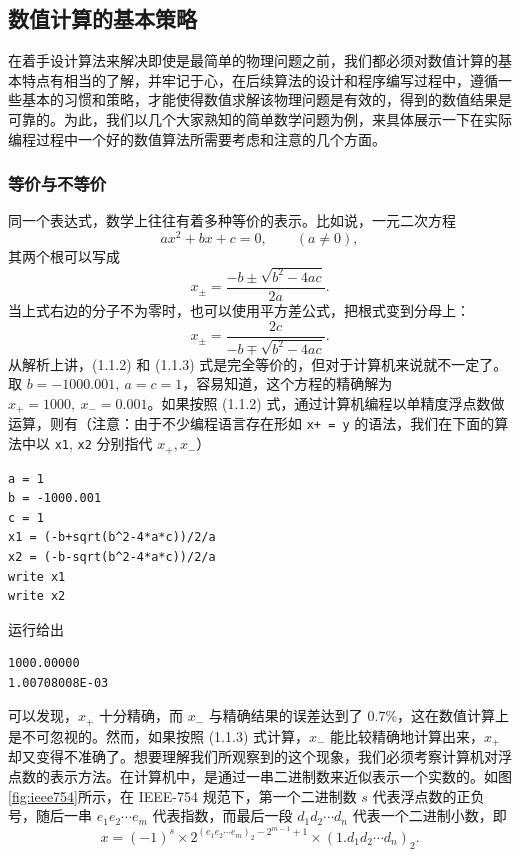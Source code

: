 \subsection{数值计算的基本策略}

在着手设计算法来解决即使是最简单的物理问题之前，我们都必须对数值计算的基本特点有相当的了解，并牢记于心，在后续算法的设计和程序编写过程中，遵循一些基本的习惯和策略，才能使得数值求解该物理问题是有效的，得到的数值结果是可靠的。为此，我们以几个大家熟知的简单数学问题为例，来具体展示一下在实际编程过程中一个好的数值算法所需要考虑和注意的几个方面。

\subsubsection{等价与不等价}

同一个表达式，数学上往往有着多种等价的表示。比如说，一元二次方程
\begin{equation}
ax^2+bx+c=0,\qquad (a\ne 0),
\tag{1.1.1}
\end{equation}
其两个根可以写成
\begin{equation}
x_{\pm}=\frac{-b\pm\sqrt{b^2-4ac}}{2a}.
\tag{1.1.2}
\end{equation}
当上式右边的分子不为零时，也可以使用平方差公式，把根式变到分母上：
\begin{equation}
x_{\pm}=\frac{2c}{-b\mp\sqrt{b^2-4ac}}.
\tag{1.1.3}
\end{equation}
从解析上讲，(1.1.2) 和 (1.1.3) 式是完全等价的，但对于计算机来说就不一定了。取 $b=-1000.001,\ a=c=1$，容易知道，这个方程的精确解为 $x_+=1000,\ x_-=0.001$。如果按照 (1.1.2) 式，通过计算机编程以单精度浮点数做运算，则有（注意：由于不少编程语言存在形如 \texttt{x+ = y} 的语法，我们在下面的算法中以 \texttt{x1}, \texttt{x2} 分别指代 $x_+,x_-$）

\begin{lstlisting}[style=bellacode]
a = 1
b = -1000.001
c = 1
x1 = (-b+sqrt(b^2-4*a*c))/2/a
x2 = (-b-sqrt(b^2-4*a*c))/2/a
write x1
write x2
\end{lstlisting}
运行给出
\begin{lstlisting}[style=bellacode]
1000.00000
1.00708008E-03
\end{lstlisting}
可以发现，$x_+$ 十分精确，而 $x_-$ 与精确结果的误差达到了 $0.7\%$，这在数值计算上是不可忽视的。然而，如果按照 (1.1.3) 式计算，$x_-$ 能比较精确地计算出来，$x_+$ 却又变得不准确了。想要理解我们所观察到的这个现象，我们必须考察计算机对浮点数的表示方法。在计算机中，是通过一串二进制数来近似表示一个实数的。如图\ref{fig:ieee754}所示，在 IEEE-754 规范下，第一个二进制数 $s$ 代表浮点数的正负号，随后一串 $e_1e_2\cdots e_m$ 代表指数，而最后一段 $d_1d_2\cdots d_n$ 代表一个二进制小数，即
\begin{equation}
x=(-1)^s\times 2^{(e_1e_2\cdots e_m)_2-2^{m-1}+1}\times (1.d_1d_2\cdots d_n)_2.
\tag{1.1.4}
\end{equation}

